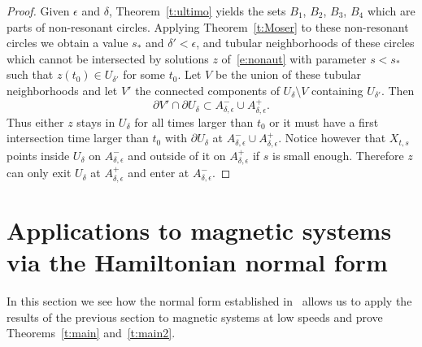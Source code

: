 \documentclass[10pt]{amsart}
\theoremstyle{definition}
\newcommand{\p}{\partial}
\begin{document}
\begin{proof}
Given $\epsilon$ and $\delta$, Theorem~\ref{t:ultimo} yields the sets $B_1$, $B_2$, $B_3$, $B_4$ which are parts of non-resonant circles. Applying Theorem~\ref{t:Moser} to these non-resonant circles we obtain a value $s_*$ and $\delta'<\epsilon$, and tubular neighborhoods of these circles which cannot be intersected by solutions $z$ of~\eqref{e:nonaut} with parameter $s<s_*$ such that $z(t_0)\in U_{\delta'}$ for some $t_0$. Let $V$ be the union of these tubular neighborhoods and let $V'$ the connected components of $U_\delta\setminus V$ containing $U_{\delta'}$. Then
\[
\p V'\cap \p U_\delta\subset A^-_{\delta,\epsilon}\cup A^+_{\delta,\epsilon}.
\]
Thus either $z$ stays in $U_\delta$ for all times larger than $t_0$ or it must have a first intersection time larger than $t_0$ with $\p U_\delta$ at $A^-_{\delta,\epsilon}\cup A^+_{\delta,\epsilon}$. Notice however that $X_{t,s}$ points inside $U_\delta$ on $A^-_{\delta,\epsilon}$ and outside of it on $A^+_{\delta,\epsilon}$ if $s$ is small enough. Therefore $z$ can only exit $U_\delta$ at $A^+_{\delta,\epsilon}$ and enter at $A^-_{\delta,\epsilon}$.
\end{proof}



\section{Applications to magnetic systems via the Hamiltonian normal form}\label{s:app}
In this section we see how the normal form established in~\cite{AB21,Castilho:2001} allows us to apply the results of the previous section to magnetic systems at low speeds and prove Theorems~\ref{t:main} and~\ref{t:main2}.
\end{document}
